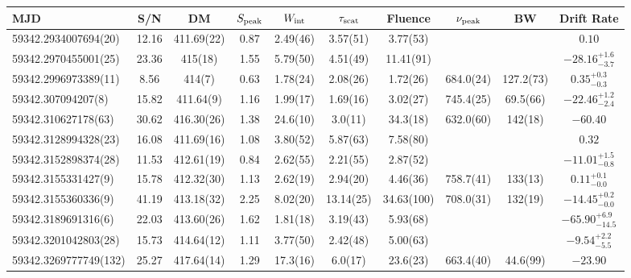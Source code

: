 \documentclass[preprint2, trackchanges]{aastex631}
\begin{document}

\scriptsize
\setlength{\tabcolsep}{0.5pt}


{\tiny
\renewcommand{\arraystretch}{1}
{\fontsize{2}{3}\selectfont
\begin{longtable}{lccccccccc}

\hline

MJD & S/N & DM & $S_{\rm peak}$ & $W_{\rm int}$ & {$\tau_{\rm scat}$}  & Fluence & $\nu_{\rm peak}$ & BW & Drift Rate
\\
\hline
59342.2934007694(20) & 12.16 & 411.69(22) & 0.87 & 2.49(46) & 3.57(51)  & 3.77(53) &  &  & $0.10$ \\
\hline
59342.2970455001(25) & 23.36 & 415(18) & 1.55 & 5.79(50) & 4.51(49)  & 11.41(91) &  &  & $-28.16^{+1.6}_{-3.7}$ \\
\hline
59342.2996973389(11) & 8.56 & 414(7) & 0.63 & 1.78(24) & 2.08(26)  & 1.72(26) & 684.0(24) & 127.2(73) & $0.35^{+0.3}_{-0.3}$ \\
\hline
59342.307094207(8) & 15.82 & 411.64(9) & 1.16 & 1.99(17) & 1.69(16)  & 3.02(27) & 745.4(25) & 69.5(66) & $-22.46^{+1.2}_{-2.4}$ \\
\hline
59342.310627178(63) & 30.62 & 416.30(26) & 1.38 & 24.6(10) & 3.0(11)  & 34.3(18) & 632.0(60) & 142(18) & $-60.40$ \\
\hline
59342.3128994328(23) & 16.08 & 411.69(16) & 1.08 & 3.80(52) & 5.87(63)  & 7.58(80) &  &  & $0.32$ \\
\hline
59342.3152898374(28) & 11.53 & 412.61(19) & 0.84 & 2.62(55) & 2.21(55)  & 2.87(52) &  &  & $-11.01^{+1.5}_{-0.8}$ \\
\hline
59342.3155331427(9) & 15.78 & 412.32(30) & 1.13 & 2.62(19) & 2.94(20)  & 4.46(36) & 758.7(41) & 133(13) & $0.11^{+0.1}_{-0.0}$ \\
\hline
59342.3155360336(9) & 41.19 & 413.18(32) & 2.25 & 8.02(20) & 13.14(25)  & 34.63(100) & 708.0(31) & 132(19) & $-14.45^{+0.2}_{-0.0}$ \\
\hline
59342.3189691316(6) & 22.03 & 413.60(26) & 1.62 & 1.81(18) & 3.19(43)  & 5.93(68) &  &  & $-65.90^{+6.9}_{-14.5}$ \\
\hline
59342.3201042803(28) & 15.73 & 414.64(12) & 1.11 & 3.77(50) & 2.42(48)  & 5.00(63) &  &  & $-9.54^{+2.2}_{-5.5}$ \\
\hline
59342.3269777749(132) & 25.27 & 417.64(14) & 1.29 & 17.3(16) & 6.0(17)  & 23.6(23) & 663.4(40) & 44.6(99) & $-23.90$ \\
\hline

\end{longtable}}}
\end{document}
